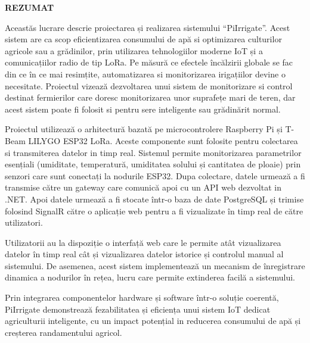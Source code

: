\thispagestyle{abstractpagestyle}

\vspace*{36pt}

\begin{center}
\textbf{\fontsize{20pt}{24pt} \selectfont REZUMAT}
\end{center}

\vspace{24pt}

Aceastăs lucrare descrie proiectarea și realizarea sistemului “PiIrrigate”. Acest sistem are ca scop eficientizarea consumului de apă si optimizarea culturilor agricole sau a grădinilor, prin utilizarea tehnologiilor moderne IoT și a comunicațiilor radio de tip LoRa. Pe măsură ce efectele încălzirii globale se fac din ce în ce mai resimțite, automatizarea si monitorizarea irigațiilor devine o necesitate. Proiectul vizează dezvoltarea unui sistem de monitorizare si control destinat fermierilor care doresc monitorizarea unor suprafețe mari de teren, dar acest sistem poate fi folosit si pentru sere inteligente  sau grădinărit normal.

\vspace{12pt}

Proiectul utilizează o arhitectură bazată pe microcontrolere Raspberry Pi și T-Beam LILYGO ESP32 LoRa. Aceste componente sunt folosite pentru colectarea si transmiterea datelor in timp real. Sistemul permite monitorizarea parametrilor esențiali (umiditate, temperatură, umiditatea solului și cantitatea de ploaie) prin senzori care sunt conectați la nodurile ESP32. Dupa colectare,  datele urmează a fi transmise către un gateway care comunică apoi cu un API web dezvoltat in .NET. Apoi datele urmează a fi stocate într-o baza de date PostgreSQL și trimise folosind SignalR către o aplicație web pentru a fi vizualizate în timp real de către utilizatori.

\vspace{12pt}
Utilizatorii au la dispoziție o interfață web care le permite atât vizualizarea datelor în timp real cât și vizualizarea datelor istorice și controlul manual al sistemului. De asemenea, acest sistem implementează un mecanism de înregistrare dinamica a nodurilor în rețea, lucru care permite extinderea facilă a sistemului.

\vspace{12pt}
Prin integrarea componentelor hardware și software într-o soluție coerentă, PiIrrigate demonstrează fezabilitatea și eficiența unui sistem IoT dedicat agriculturii inteligente, cu un impact potențial in reducerea consumului de apă și creșterea randamentului agricol.

\vfill